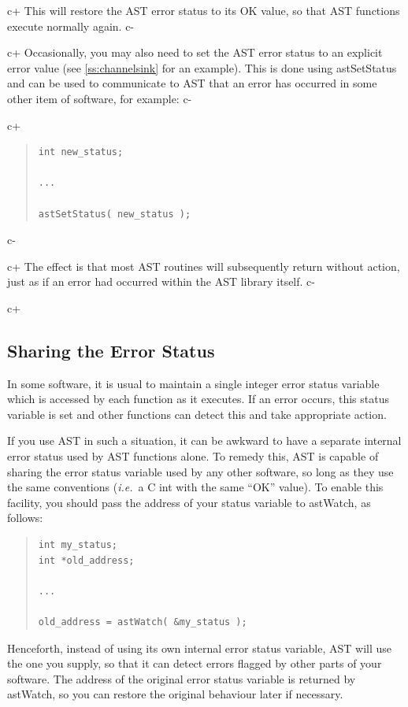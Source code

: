 \documentclass[twoside,11pt]{article}
\newcommand{\secref}[1]{\S\ref{#1}}
\renewcommand{\secref}[1]{\ref{#1}}
\begin{document}
c+
This will restore the AST error status to its OK value, so that AST
functions execute normally again.
c-

c+
Occasionally, you may also need to set the AST error status to an
explicit error value (see \secref{ss:channelsink} for an
example). This is done using astSetStatus and can be used to
communicate to AST that an error has occurred in some other item of
software, for example:
c-

c+
\begin{quote}
\small
\begin{verbatim}
int new_status;

...

astSetStatus( new_status );
\end{verbatim}
\normalsize
\end{quote}
c-

c+
The effect is that most AST routines will subsequently return without
action, just as if an error had occurred within the AST library
itself.
c-

c+
\subsection{Sharing the Error Status}

In some software, it is usual to maintain a single integer error
status variable which is accessed by each function as it executes. If
an error occurs, this status variable is set and other functions can
detect this and take appropriate action.

If you use AST in such a situation, it can be awkward to have a
separate internal error status used by AST functions alone. To remedy
this, AST is capable of sharing the error status variable used by any
other software, so long as they use the same conventions
({\em{i.e.}}\ a C int with the same ``OK'' value). To enable this
facility, you should pass the address of your status variable to
astWatch, as follows:

\begin{quote}
\small
\begin{verbatim}
int my_status;
int *old_address;

...

old_address = astWatch( &my_status );
\end{verbatim}
\normalsize
\end{quote}

Henceforth, instead of using its own internal error status variable,
AST will use the one you supply, so that it can detect errors flagged
by other parts of your software. The address of the original error
status variable is returned by astWatch, so you can restore the
original behaviour later if necessary.
\end{document}
